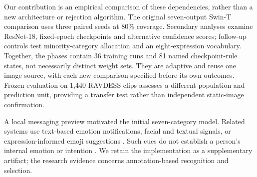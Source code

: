 Our contribution is an empirical comparison of these dependencies, rather than a new architecture or rejection algorithm. The original seven-output Swin-T comparison uses three paired seeds at 80\% coverage. Secondary analyses examine ResNet-18, fixed-epoch checkpoints and alternative confidence scores; follow-up controls test minority-category allocation and an eight-expression vocabulary. Together, the phases contain 36 training runs and 81 named checkpoint-rule states, not necessarily distinct weight sets. They are adaptive and reuse one image source, with each new comparison specified before its own outcomes. Frozen evaluation on 1,440 RAVDESS clips \cite{livingstone2018ravdess} assesses a different population and prediction unit, providing a transfer test rather than independent static-image confirmation.

A local messaging preview motivated the initial seven-category model. Related systems use text-based emotion notifications, facial and textual signals, or expression-informed emoji suggestions \cite{wang2016emotionpush,chong2019emochat,liu2019selfawareness}. Such cues do not establish a person's internal emotion or intention \cite{barrett2019emotions}. We retain the implementation as a supplementary artifact; the research evidence concerns annotation-based recognition and selection.
